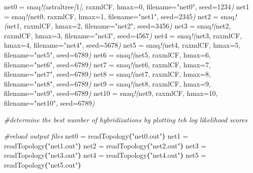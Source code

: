 \documentclass[
  12pt,
]{article}
\newenvironment{Shaded}{\begin{snugshade}}{\end{snugshade}}
\newcommand{\CommentTok}[1]{\textcolor[rgb]{0.56,0.35,0.01}{\textit{#1}}}
\newcommand{\ErrorTok}[1]{\textcolor[rgb]{0.64,0.00,0.00}{\textbf{#1}}}
\newcommand{\ExtensionTok}[1]{#1}
\newcommand{\KeywordTok}[1]{\textcolor[rgb]{0.13,0.29,0.53}{\textbf{#1}}}
\newcommand{\NormalTok}[1]{#1}
\newcommand{\PreprocessorTok}[1]{\textcolor[rgb]{0.56,0.35,0.01}{\textit{#1}}}
\newcommand{\SpecialStringTok}[1]{\textcolor[rgb]{0.31,0.60,0.02}{#1}}
\newcommand{\StringTok}[1]{\textcolor[rgb]{0.31,0.60,0.02}{#1}}
\begin{document}
\begin{Shaded}
\begin{Highlighting}[]
\ExtensionTok{net0}\NormalTok{ = snaq}\PreprocessorTok{!(}\NormalTok{astraltree}\PreprocessorTok{[}\SpecialStringTok{1}\PreprocessorTok{]}\NormalTok{, raxmlCF, hmax=0, filename=}\StringTok{"net0"}\NormalTok{, seed=1234}\PreprocessorTok{)}
\ExtensionTok{net1}\NormalTok{ = snaq}\PreprocessorTok{!(}\NormalTok{net0, raxmlCF, hmax=1, filename=}\StringTok{"net1"}\NormalTok{, seed=2345}\PreprocessorTok{)}
\ExtensionTok{net2}\NormalTok{ = snaq}\PreprocessorTok{!(}\NormalTok{net1, raxmlCF, hmax=2, filename=}\StringTok{"net2"}\NormalTok{, seed=3456}\PreprocessorTok{)}
\ExtensionTok{net3}\NormalTok{ = snaq}\PreprocessorTok{!(}\NormalTok{net2, raxmlCF, hmax=3, filename=}\StringTok{"net3"}\NormalTok{, seed=4567}\PreprocessorTok{)}
\ExtensionTok{net4}\NormalTok{ = snaq}\PreprocessorTok{!(}\NormalTok{net3, raxmlCF, hmax=4, filename=}\StringTok{"net4"}\NormalTok{, seed=5678}\PreprocessorTok{)}
\ExtensionTok{net5}\NormalTok{ = snaq}\PreprocessorTok{!(}\NormalTok{net4, raxmlCF, hmax=5, filename=}\StringTok{"net5"}\NormalTok{, seed=6789}\PreprocessorTok{)}
\ExtensionTok{net6}\NormalTok{ = snaq}\PreprocessorTok{!(}\NormalTok{net5, raxmlCF, hmax=6, filename=}\StringTok{"net6"}\NormalTok{, seed=6789}\PreprocessorTok{)}
\ExtensionTok{net7}\NormalTok{ = snaq}\PreprocessorTok{!(}\NormalTok{net6, raxmlCF, hmax=7, filename=}\StringTok{"net7"}\NormalTok{, seed=6789}\PreprocessorTok{)}
\ExtensionTok{net8}\NormalTok{ = snaq}\PreprocessorTok{!(}\NormalTok{net7, raxmlCF, hmax=8, filename=}\StringTok{"net8"}\NormalTok{, seed=6789}\PreprocessorTok{)}
\ExtensionTok{net9}\NormalTok{ = snaq}\PreprocessorTok{!(}\NormalTok{net8, raxmlCF, hmax=9, filename=}\StringTok{"net9"}\NormalTok{, seed=6789}\PreprocessorTok{)}
\ExtensionTok{net10}\NormalTok{ = snaq}\PreprocessorTok{!(}\NormalTok{net9, raxmlCF, hmax=10, filename=}\StringTok{"net10"}\NormalTok{, seed=6789}\PreprocessorTok{)}

\CommentTok{\#determine the best number of hybridizations by plotting teh log likelihood scores}

\CommentTok{\#reload output files}
\ExtensionTok{net0}\NormalTok{ = readTopology}\ErrorTok{(}\StringTok{"net0.out"}\KeywordTok{)}
\ExtensionTok{net1}\NormalTok{ = readTopology}\ErrorTok{(}\StringTok{"net1.out"}\KeywordTok{)}
\ExtensionTok{net2}\NormalTok{ = readTopology}\ErrorTok{(}\StringTok{"net2.out"}\KeywordTok{)}
\ExtensionTok{net3}\NormalTok{ = readTopology}\ErrorTok{(}\StringTok{"net3.out"}\KeywordTok{)}
\ExtensionTok{net4}\NormalTok{ = readTopology}\ErrorTok{(}\StringTok{"net4.out"}\KeywordTok{)}
\ExtensionTok{net5}\NormalTok{ = readTopology}\ErrorTok{(}\StringTok{"net5.out"}\KeywordTok{)}


\end{Highlighting}
\end{Shaded}
\end{document}
